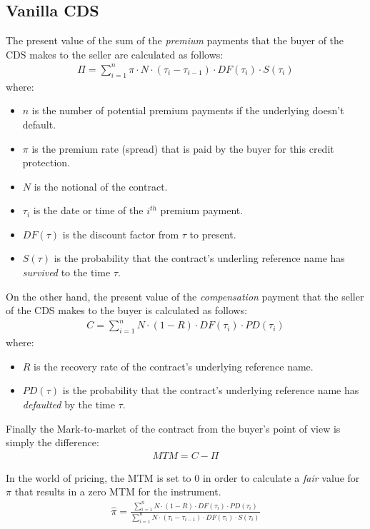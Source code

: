 \documentclass{report}
\theoremstyle{plain}
\theoremstyle{definition}
\begin{document}
\subsection{Vanilla CDS}
The present value of the sum of the \emph{premium} payments that the buyer of the CDS makes to the seller are calculated as follows:
\begin{align*}
\Pi = \sum_{i=1}^{n}\pi \cdot N \cdot (\tau_i - \tau_{i-1}) \cdot DF(\tau_i) \cdot S(\tau_i)
\end{align*}
where:
\begin{itemize}
	\item $n$ is the number of potential premium payments if the underlying doesn't default.
	\item $\pi$ is the premium rate (spread) that is paid by the buyer for this credit protection.
	\item $N$ is the notional of the contract.
	\item $\tau_i$ is the date or time of the $i^{th}$ premium payment.
	\item $DF(\tau)$ is the discount factor from $\tau$ to present.
	\item $S(\tau)$ is the probability that the contract's underling reference name has \emph{survived} to the time $\tau$.
\end{itemize}

On the other hand, the present value of the \emph{compensation} payment that the seller of the CDS makes to the buyer is calculated as follows:
\begin{align*}
C = \sum_{i=1}^{n} N \cdot (1-R) \cdot DF(\tau_i) \cdot PD(\tau_i)
\end{align*}
where:
\begin{itemize}
	\item $R$ is the recovery rate of the contract's underlying reference name.
	\item $PD(\tau)$ is the probability that the contract's underlying reference name has \emph{defaulted} by the time $\tau$.
\end{itemize}

Finally the Mark-to-market of the contract from the buyer's point of view is simply the difference:
\begin{align*}
MTM = C - \Pi
\end{align*}

In the world of pricing, the MTM is set to 0 in order to calculate a \textit{fair} value for $\pi$ that results in a zero MTM for the instrument. 
\begin{align*}
\hat{\pi} = \frac{\sum_{i=1}^{n} N \cdot (1-R) \cdot DF(\tau_i) \cdot PD(\tau_i)}{\sum_{i=1}^{n} N \cdot (\tau_i - \tau_{i-1}) \cdot DF(\tau_i) \cdot S(\tau_i)}
\end{align*}
\end{document}

